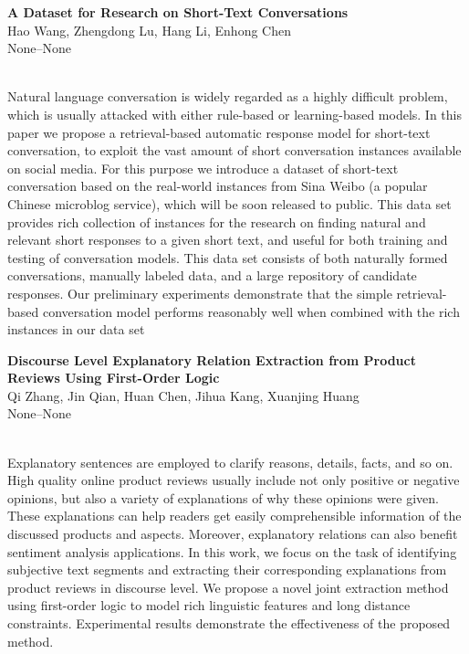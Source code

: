 \documentclass[twoside,makeidx]{book}
\begin{document}
\par\vspace{2em}\noindent%
\begin{minipage}{\linewidth}%
\begin{center}
\textbf{\normalsize A Dataset for Research on Short-Text Conversations}\\
\normalsize  Hao Wang,  Zhengdong Lu,  Hang Li,  Enhong Chen\\
{\small None--None}\\
\end{center}
\end{minipage}\\[0.5em]
\nopagebreak%
\noindent%
{\small Natural language conversation is widely regarded as a highly difficult problem, which is usually attacked with either rule-based or learning-based models. In this paper we propose a retrieval-based automatic response model for short-text conversation, to exploit the vast amount of short conversation instances available on social media. For this purpose we introduce a dataset of short-text conversation based on the real-world instances from Sina Weibo (a popular Chinese microblog service), which will be soon released to public. This data set provides rich collection of instances for the research on finding natural and relevant short responses to a given short text, and useful for both training and testing of conversation models. This data set consists of both naturally formed conversations, manually labeled data, and a large repository of candidate responses. Our preliminary experiments demonstrate that the simple retrieval-based conversation model performs reasonably well when combined with the rich instances in our data set}
\par\vspace{2em}\noindent%
\begin{minipage}{\linewidth}%
\begin{center}
\textbf{\normalsize Discourse Level Explanatory Relation Extraction from Product Reviews Using First-Order Logic}\\
\normalsize  Qi Zhang,  Jin Qian,  Huan Chen,  Jihua Kang,  Xuanjing Huang\\
{\small None--None}\\
\end{center}
\end{minipage}\\[0.5em]
\nopagebreak%
\noindent%
{\small Explanatory sentences are employed to clarify reasons, details, facts, and so on. High quality online product reviews usually include not only positive or negative opinions, but also a variety of explanations of why these opinions were given.  These explanations can  help readers get easily comprehensible information of the discussed products and aspects. Moreover, explanatory relations can also benefit sentiment analysis applications. In this work, we focus on the task of identifying subjective text segments and extracting their corresponding explanations from product reviews in discourse level. We propose a novel joint extraction method using first-order logic to model rich linguistic features and long distance constraints. Experimental results demonstrate the effectiveness of the proposed method.}
\end{document}
